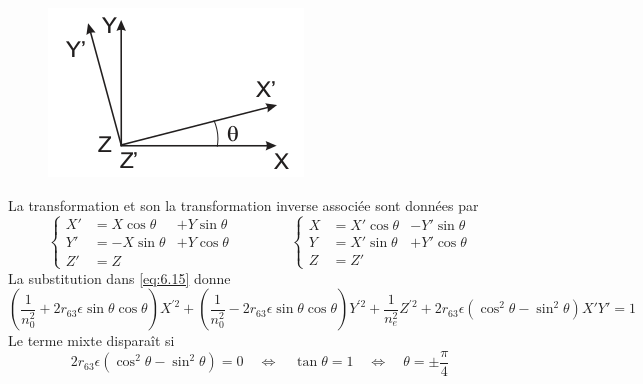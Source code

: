 	\begin{figure}
	\vspace{-5mm}
	\includegraphics[scale=0.5]{ch6/image2}
	\end{figure}
La transformation et son la transformation inverse associée sont données par
\begin{equation}
\left\{\begin{array}{lll}
X' &= X\cos\theta &+ Y\sin\theta\\
Y' &= -X\sin\theta&+ Y\cos\theta\\
Z' &= Z
\end{array}\right.\qquad\qquad
\left\{\begin{array}{lll}
X &= X'\cos\theta &- Y'\sin\theta\\
Y &= X'\sin\theta&+ Y'\cos\theta\\
Z &= Z'
\end{array}\right.
\end{equation}
La substitution dans \eqref{eq:6.15} donne
\begin{equation}
\left(\dfrac{1}{n_0^2}+2r_{63}\epsilon\sin\theta\cos\theta\right)X^{'2}+
\left(\dfrac{1}{n_0^2}-2r_{63}\epsilon\sin\theta\cos\theta\right)Y^{'2}+\dfrac{1}{n_e^2}Z^{'2}+
2r_{63}\epsilon(\cos^2\theta-\sin^2\theta)X'Y'=1
\label{eq:6.18}
\end{equation}
Le terme mixte disparaît si
\begin{equation}
2r_{63}\epsilon(\cos^2\theta-\sin^2\theta)=0\quad\Leftrightarrow\quad \tan\theta=1\quad
\Leftrightarrow\quad\theta=\pm\frac{\pi}{4}
\end{equation}

